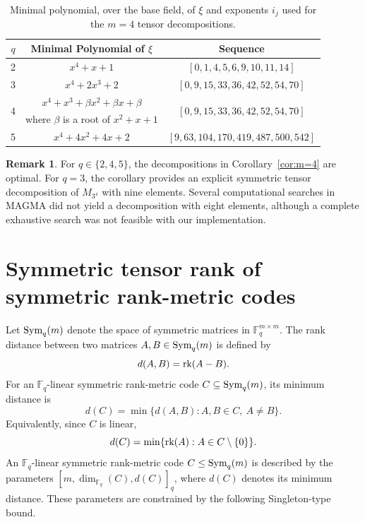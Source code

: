 \documentclass[11pt,a4paper,reqno]{article}
\numberwithin{equation}{section}
\theoremstyle{definition}
\newtheorem{remark}[theorem]{Remark}
\newcommand{\rk}{\textnormal{rk}}
\newcommand{\Sym}{{\textnormal{Sym}}}
\begin{document}
\begin{table}[h]
    \centering
    \begin{tabular}{|c|c|c|}\hline
        $q$ &  Minimal Polynomial of $\xi$ & Sequence\\\hline
        2 & $x^4 + x + 1$ & $[ 0, 1, 4, 5, 6, 9, 10, 11, 14 ]$\\\hline
        3 & $x^4+2x^3+2$ & $[ 0, 9, 15, 33, 36, 42, 52, 54, 70 ]$\\\hline
        \multirow{2}{*}{4} & $x^4+x^3+\beta x^2+ \beta x+\beta$ & \multirow{2}{*}{$[ 0, 9, 15, 33, 36, 42, 52, 54, 70 ]$}\\
         & where $\beta$ is a root of $x^2+x+1$ & \\\hline
        5 & $x^4+4x^2+4x+2$ & $[ 9, 63, 104, 170, 419, 487, 500, 542 ]$\\\hline
    \end{tabular}
    \captionsetup{width=0.85\textwidth}
    \caption{Minimal polynomial, over the base field, of \(\xi\) and exponents \(i_j\) used for the \(m=4\) tensor decompositions. }
    \label{table:m4}
\end{table}

\begin{remark}
For \(q\in\{2,4,5\}\), the decompositions in Corollary~\ref{cor:m=4} are optimal.
For \(q=3\), the corollary provides an explicit symmetric tensor decomposition of
\(M_{3^4}\) with nine elements. Several computational searches in MAGMA did not yield a
decomposition with eight elements, although a complete exhaustive search was not feasible with our implementation.
\end{remark}




\section{Symmetric tensor rank of symmetric rank-metric codes}\label{sec:rankmetriccodes}

Let \(\Sym_q(m)\) denote the space of symmetric matrices in
\(\mathbb F_q^{m\times m}\). The rank distance between two matrices
\(A,B\in\Sym_q(m)\) is defined by
\[
d(A,B)=\rk(A-B).
\]
For an \(\mathbb F_q\)-linear symmetric rank-metric code
\(C\subseteq \Sym_q(m)\), its minimum distance is
\[
d(C)=\min\{d(A,B):A,B\in C,\ A\ne B\}.
\]
Equivalently, since \(C\) is linear,
\[
d(C)=\min\{\rk(A):A\in C\setminus\{0\}\}.
\]
An \(\mathbb F_q\)-linear symmetric rank-metric code
\(C\leq \Sym_q(m)\) is described by the parameters $[m,\dim_{\mathbb F_q}(C),d(C)]_q$, where \(d(C)\) denotes its minimum distance. These parameters are constrained by the following Singleton-type bound.
\end{document}
